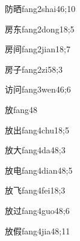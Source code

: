 \begin{verbete}{防晒}{fang2shai4}{6;10}
\end{verbete}

\begin{verbete}{房东}{fang2dong1}{8;5}
\end{verbete}

\begin{verbete}{房间}{fang2jian1}{8;7}
\end{verbete}

\begin{verbete}{房子}{fang2zi5}{8;3}
\end{verbete}

\begin{verbete}{访问}{fang3wen4}{6;6}
\end{verbete}

\begin{verbete}{放}{fang4}{8}
\end{verbete}

\begin{verbete}{放出}{fang4chu1}{8;5}
\end{verbete}

\begin{verbete}{放大}{fang4da4}{8;3}
\end{verbete}

\begin{verbete}{放电}{fang4dian4}{8;5}
\end{verbete}

\begin{verbete}{放飞}{fang4fei1}{8;3}
\end{verbete}

\begin{verbete}{放过}{fang4guo4}{8;6}
\end{verbete}

\begin{verbete}{放假}{fang4jia4}{8;11}
\end{verbete}

